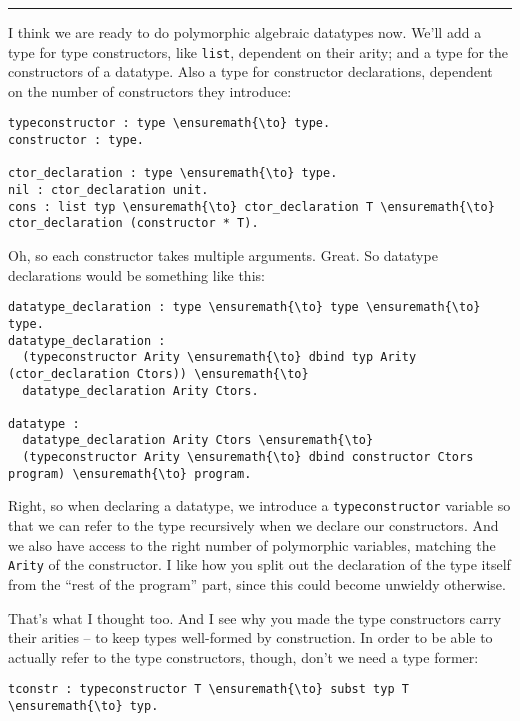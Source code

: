\begin{center}\rule{0.5\linewidth}{\linethickness}\end{center}

\heroADVISOR{} I think we are ready to do polymorphic algebraic datatypes now.
We'll add a type for type constructors, like \texttt{list}, dependent on
their arity; and a type for the constructors of a datatype. Also a type
for constructor declarations, dependent on the number of constructors
they introduce:

\begin{verbatim}
typeconstructor : type \ensuremath{\to} type.
constructor : type.

ctor_declaration : type \ensuremath{\to} type.
nil : ctor_declaration unit.
cons : list typ \ensuremath{\to} ctor_declaration T \ensuremath{\to} ctor_declaration (constructor * T).
\end{verbatim}

\heroSTUDENT{} Oh, so each constructor takes multiple arguments. Great. So
datatype declarations would be something like this:

\begin{verbatim}
datatype_declaration : type \ensuremath{\to} type \ensuremath{\to} type.
datatype_declaration : 
  (typeconstructor Arity \ensuremath{\to} dbind typ Arity (ctor_declaration Ctors)) \ensuremath{\to}
  datatype_declaration Arity Ctors.

datatype :
  datatype_declaration Arity Ctors \ensuremath{\to}
  (typeconstructor Arity \ensuremath{\to} dbind constructor Ctors program) \ensuremath{\to} program.
\end{verbatim}

\heroADVISOR{} Right, so when declaring a datatype, we introduce a
\texttt{typeconstructor} variable so that we can refer to the type
recursively when we declare our constructors. And we also have access to
the right number of polymorphic variables, matching the \texttt{Arity}
of the constructor. I like how you split out the declaration of the type
itself from the ``rest of the program'' part, since this could become
unwieldy otherwise.

\heroSTUDENT{} That's what I thought too. And I see why you made the type
constructors carry their arities -- to keep types well-formed by
construction. In order to be able to actually refer to the type
constructors, though, don't we need a type former:

\begin{verbatim}
tconstr : typeconstructor T \ensuremath{\to} subst typ T \ensuremath{\to} typ.
\end{verbatim}

